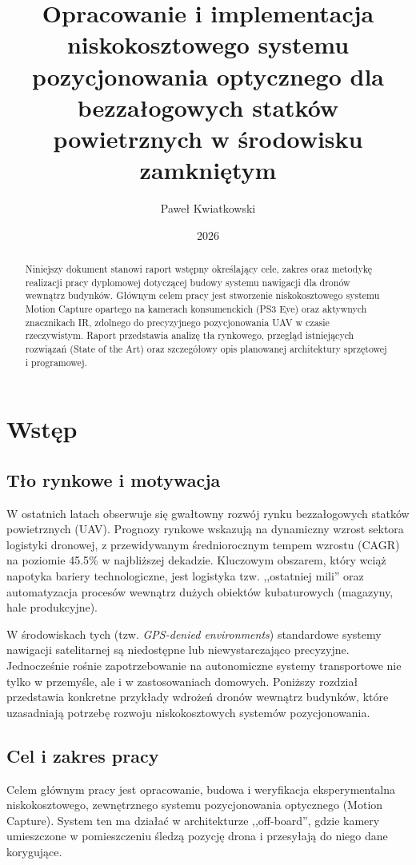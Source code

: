 \documentclass{EE-dyplom}
\title{Opracowanie i implementacja niskokosztowego systemu pozycjonowania optycznego dla bezzałogowych statków powietrznych w środowisku zamkniętym}
\author{Paweł Kwiatkowski}
\date{2026}
\begin{document}
\sloppy
\maketitle

\newpage
{}
\setcounter{page}{1}

\begin{abstract}
Niniejszy dokument stanowi raport wstępny określający cele, zakres oraz metodykę realizacji pracy dyplomowej dotyczącej budowy systemu nawigacji dla dronów wewnątrz budynków. Głównym celem pracy jest stworzenie niskokosztowego systemu Motion Capture opartego na kamerach konsumenckich (PS3 Eye) oraz aktywnych znacznikach IR, zdolnego do precyzyjnego pozycjonowania UAV w czasie rzeczywistym. Raport przedstawia analizę tła rynkowego, przegląd istniejących rozwiązań (State of the Art) oraz szczegółowy opis planowanej architektury sprzętowej i programowej.
\end{abstract}

\newpage
\tableofcontents
\newpage

\section{Wstęp}

\subsection{Tło rynkowe i motywacja}
W ostatnich latach obserwuje się gwałtowny rozwój rynku bezzałogowych statków powietrznych (UAV). Prognozy rynkowe wskazują na dynamiczny wzrost sektora logistyki dronowej, z przewidywanym średniorocznym tempem wzrostu (CAGR) na poziomie 45.5\% w najbliższej dekadzie. Kluczowym obszarem, który wciąż napotyka bariery technologiczne, jest logistyka tzw. ,,ostatniej mili'' oraz automatyzacja procesów wewnątrz dużych obiektów kubaturowych (magazyny, hale produkcyjne).

W środowiskach tych (tzw. \textit{GPS-denied environments}) standardowe systemy nawigacji satelitarnej są niedostępne lub niewystarczająco precyzyjne. Jednocześnie rośnie zapotrzebowanie na autonomiczne systemy transportowe nie tylko w przemyśle, ale i w zastosowaniach domowych. Poniższy rozdział przedstawia konkretne przykłady wdrożeń dronów wewnątrz budynków, które uzasadniają potrzebę rozwoju niskokosztowych systemów pozycjonowania.

\subsection{Cel i zakres pracy}
Celem głównym pracy jest opracowanie, budowa i weryfikacja eksperymentalna niskokosztowego, zewnętrznego systemu pozycjonowania optycznego (Motion Capture). System ten ma działać w architekturze ,,off-board'', gdzie kamery umieszczone w pomieszczeniu śledzą pozycję drona i przesyłają do niego dane korygujące.
\end{document}
